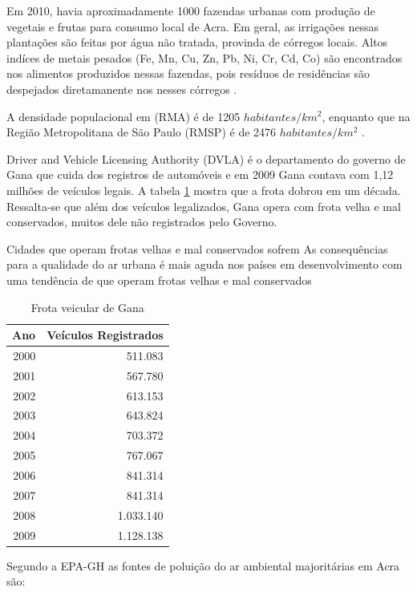 
Em 2010, havia aproximadamente 1000 fazendas urbanas com produção de vegetais e
frutas para consumo local de Acra. Em geral, as irrigações nessas plantações
são feitas por água não tratada, provinda de córregos locais. 
Altos indíces de metais pesados (Fe, Mn, Cu, Zn, Pb, Ni, Cr, Cd, Co)
são encontrados nos alimentos produzidos nessas fazendas, pois resíduos de
residências são despejados diretamanente nos nesses córregos \citep{lente2014}.

A densidade populacional em (RMA) é de 1205 $habitantes/km^2$, 
enquanto que na Região Metropolitana de São Paulo (RMSP) é de 
2476 $habitantes/km^2$ \citep{ibge2011}. 

Driver and Vehicle Licensing Authority (DVLA) é o
departamento do governo de Gana que cuida dos registros de automóveis
e em 2009 Gana contava com 1,12 milhões de veículos legais. 
A tabela \ref{table:dvla} mostra que a frota dobrou em um década.
Ressalta-se que além dos veículos legalizados, Gana opera com frota velha e 
mal conservados, muitos dele não registrados pelo Governo. 

Cidades que operam frotas velhas e mal conservados sofrem 
As consequências para a qualidade do ar urbana é mais aguda nos países em desenvolvimento
com uma tendência de que operam frotas velhas e mal conservados

\begin{table}[H]
 \centering
  \begin{tabular}{rr}
  \hline
  Ano & Veículos Registrados \\ 
  \hline
  2000 & 511.083 \\ 
  2001 & 567.780 \\ 
  2002 & 613.153 \\ 
  2003 & 643.824 \\ 
  2004 & 703.372 \\ 
  2005 & 767.067 \\ 
  2006 & 841.314 \\ 
  2007 & 841.314 \\ 
  2008 & 1.033.140 \\ 
  2009 & 1.128.138 \\ 
  \hline
  \end{tabular}
  \caption{Frota veicular de Gana \citep{dvla} \label{table:dvla}}
\end{table}

Segundo a EPA-GH \citep{epa2015} as fontes de poluição do ar ambiental 
majoritárias em Acra são:

